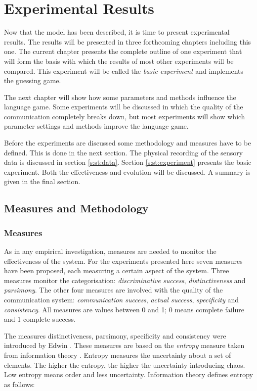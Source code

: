 \chapter{Experimental Results}\label{ch:basic}


Now that the model has been described, it is time to present
experimental results. The results will be presented in three
forthcoming chapters including this one. The current chapter presents the complete outline of one experiment that will form the basis with which
the results of most other experiments will be compared. This experiment will be called the {\em basic experiment} and implements the guessing game.

The next chapter will show how some parameters and methods
influence the language game. Some experiments will be discussed
in which the quality of the communication completely breaks
down, but most experiments will show which parameter settings
and methods improve the language game.


Before the experiments are discussed some methodology and measures have
to be defined. This is done in the next section. The physical
recording of the sensory data is discussed in section
\ref{s:st:data}. Section \ref{s:st:experiment} presents the
basic experiment. Both the effectiveness and evolution will be
discussed. A summary is given in the final section.

\section{Measures and Methodology}\label{s:st:measures}

\subsection{Measures}

As in any empirical investigation, measures are needed to
monitor the effectiveness of the system. For the experiments
presented here seven measures have been proposed, each measuring
a certain aspect of the system. Three measures monitor the categorisation: {\em discriminative success}, {\em
distinctiveness} and {\em parsimony}. The other four measures
are involved with the quality of the communication system: {\em
communication success}, {\em actual success}, {\em
specificity} and {\em consistency}. All measures are values between 0 and 1; 0 means complete failure and 1 complete success.

The measures distinctiveness, parsimony, specificity and consistency were introduced by Edwin \citet{dejong:2000}. These measures are based on the {\em entropy} measure taken from information theory \citep{shannon:1948}. Entropy measures the uncertainty about a set of elements. The higher the entropy, the higher the uncertainty introducing chaos. Low entropy means order and less uncertainty. Information theory defines entropy as follows:

